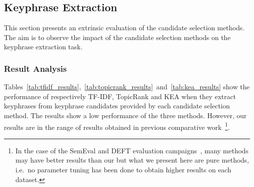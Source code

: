 

  \subsection{Keyphrase Extraction}
  \label{subsec:keyphrase_extraction}
    This section presents an extrinsic evaluation of the candidate selection
    methods. The aim is to observe the impact of the candidate selection
    methods on the keyphrase extraction task.

    \subsubsection{Result Analysis}
    \label{subsubsec:candidate_extraction_result_analysis}
      Tables~\ref{tab:tfidf_results},~\ref{tab:topicrank_results}~and~\ref{tab:kea_results}
      show the performance of respectively TF-IDF, TopicRank and KEA when
      they extract keyphrases from keyphrase candidates provided by each
      candidate selection method. The results show a low performance of the
      three methods. However, our results are in the range of results obtained
      in previous comparative
      work~\cite{hassan2010conundrums,kim2010semeval,paroubek2012deft}\footnote{In
      the case of the SemEval and DEFT evaluation
      campaigns~\cite{kim2010semeval,paroubek2012deft}, many methods may have
      better results than our but what we present here are pure methods,
      i.e.~no parameter tuning has been done to obtain higher results on each
      dataset.}.
